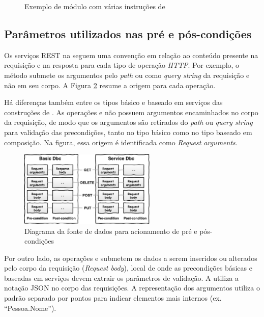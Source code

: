\begin{figure}[htb]
\begin{scriptsize}

\end{scriptsize}
\caption{Exemplo de módulo \neoidl{} com várias instruções de \designbycontract{}}
\label{lst:ModuloNeoVariosDbC}
\end{figure} 	



\subsection{Parâmetros utilizados nas pré e pós-condições}
\label{FonteDadosDbc}

Os serviços REST na \neoidl{} seguem uma convenção em relação ao conteúdo
presente na requisição e na resposta para cada tipo de operação \emph{HTTP}.
Por exemplo, o método 
submete os argumentos pelo \emph{path} ou como \textit{query string} da
requisição e não em seu corpo. A Figura \ref{Fig:FonteDadosDbcNeoIDL} resume a origem para cada operação.

Há diferenças também entre os tipos básico e baseado em serviços das construções
de \designbycontract{}. As operações  e  não possuem
argumentos encaminhados no corpo da requisição, de modo que os argumentos são
retirados do \emph{path} ou \emph{query string} para va\-li\-da\-ção das precondições, 
tanto no tipo básico como no tipo baseado em
composição. Na figura, essa origem é identificada como \textit{Request arguments}.

\begin{figure}[!htb]
\centering
\includegraphics[width=65mm,trim = 0mm 0mm 0mm
0mm,clip]{img/FonteDadosDbcNeoIDLIngles.pdf}
\caption{Diagrama da fonte de dados para acionamento de pré e pós-condições}
\label{Fig:FonteDadosDbcNeoIDL}
\end{figure}


Por outro lado, as operações  e  submetem os dados a
serem inseridos ou alterados pelo corpo da requisição (\textit{Request body}),
local de onde as precondições básicas e baseadas em serviços devem extrair os
parâmetros de validação.
A \neoidl{} utiliza a notação JSON\cite{JSon} no corpo das requisições. A
representação dos argumentos utiliza o padrão separado por pontos para indicar
elementos mais internos (ex. ``Pessoa.Nome'').

